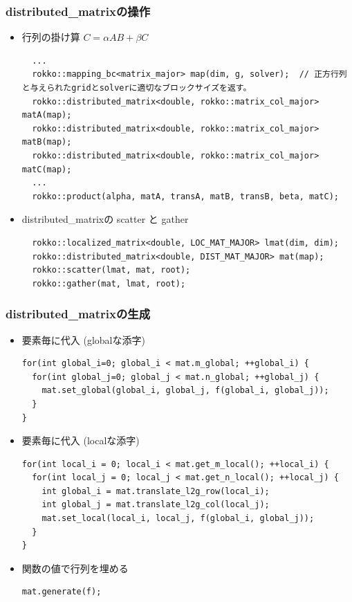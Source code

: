 \begin{frame}[c,fragile]
  \frametitle{distributed\_matrixの操作}
  \begin{itemize}
  \item 行列の掛け算 $C = \alpha A B + \beta C$
\begin{lstlisting}
  ...
  rokko::mapping_bc<matrix_major> map(dim, g, solver);  // 正方行列と与えられたgridとsolverに適切なブロックサイズを返す。
  rokko::distributed_matrix<double, rokko::matrix_col_major> matA(map);
  rokko::distributed_matrix<double, rokko::matrix_col_major> matB(map);
  rokko::distributed_matrix<double, rokko::matrix_col_major> matC(map);
  ...
  rokko::product(alpha, matA, transA, matB, transB, beta, matC);
\end{lstlisting}
  \item distributed\_matrixの scatter と gather
\begin{lstlisting}
  rokko::localized_matrix<double, LOC_MAT_MAJOR> lmat(dim, dim);
  rokko::distributed_matrix<double, DIST_MAT_MAJOR> mat(map);
  rokko::scatter(lmat, mat, root);
  rokko::gather(mat, lmat, root);
\end{lstlisting}
  \end{itemize}
\end{frame}

\begin{frame}[c,fragile]
  \frametitle{distributed_matrixの生成}
  \begin{itemize}
  \item 要素毎に代入 (globalな添字)
\begin{lstlisting}
for(int global_i=0; global_i < mat.m_global; ++global_i) {
  for(int global_j=0; global_j < mat.n_global; ++global_j) {
    mat.set_global(global_i, global_j, f(global_i, global_j));
  }
}
\end{lstlisting}
  \item 要素毎に代入 (localな添字)
\begin{lstlisting}
for(int local_i = 0; local_i < mat.get_m_local(); ++local_i) {
  for(int local_j = 0; local_j < mat.get_n_local(); ++local_j) {
    int global_i = mat.translate_l2g_row(local_i);
    int global_j = mat.translate_l2g_col(local_j);
    mat.set_local(local_i, local_j, f(global_i, global_j));
  }
}
\end{lstlisting}
  \item 関数の値で行列を埋める
\begin{lstlisting}
mat.generate(f);
\end{lstlisting}
  \end{itemize}
\end{frame}

